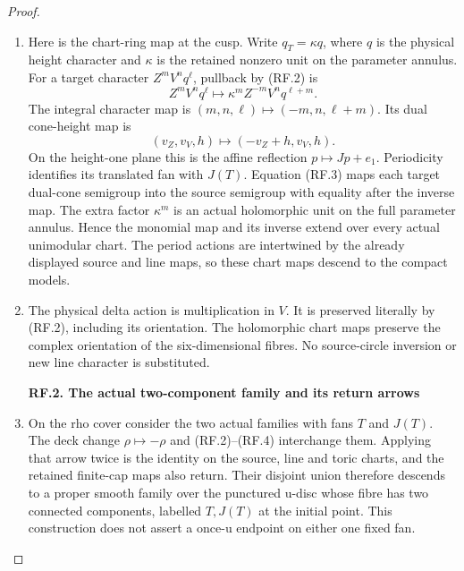 \begin{proof}
\begin{enumerate}[label=\arabic*.]
\item Here is the chart-ring map at the cusp. Write \(q_T=\kappa q\),
where \(q\) is the physical height character and \(\kappa\)
is the retained nonzero unit on the parameter annulus. For a target
character \(Z^mV^nq^\ell\), pullback by (RF.2) is
\[
          Z^mV^nq^\ell\longmapsto
             \kappa^m Z^{-m}V^nq^{\ell+m}.             \tag{RF.3}
\]
The integral character map is
\((m,n,\ell)\mapsto(-m,n,\ell+m)\). Its dual cone-height
map is
\[
                 (v_Z,v_V,h)\mapsto(-v_Z+h,v_V,h).
                                                               \tag{RF.4}
\]
On the height-one plane this is the affine reflection
\(p\mapsto Jp+e_1\). Periodicity identifies its translated fan
with \(J(T)\). Equation (RF.3) maps each target dual-cone
semigroup into the source semigroup with equality after the inverse
map. The extra factor \(\kappa^m\) is an actual holomorphic unit
on the full parameter annulus. Hence the monomial map and its
inverse extend over every actual unimodular chart. The period
actions are intertwined by the already displayed source and line
maps, so these chart maps descend to the compact models.

\item The physical delta action is multiplication in \(V\). It is
preserved literally by (RF.2), including its orientation. The
holomorphic chart maps preserve the complex orientation of the
six-dimensional fibres. No source-circle inversion or new line
character is substituted.

\par

\medskip\noindent\textbf{RF.2. The actual two-component family and its return arrows}

\par\nobreak

\item On the rho cover consider the two actual families with fans
\(T\) and \(J(T)\). The deck change \(\rho\mapsto-\rho\)
and (RF.2)--(RF.4) interchange them. Applying that arrow twice is
the identity on the source, line and toric charts, and the retained
finite-cap maps also return. Their disjoint union therefore descends
to a proper smooth family over the punctured u-disc whose fibre has
two connected components, labelled \(T,J(T)\) at the initial
point. This construction does not assert a once-u endpoint on either
one fixed fan.


\end{enumerate}
\end{proof}
